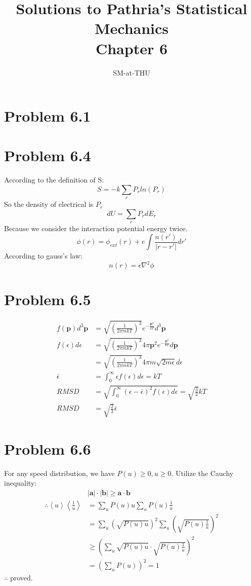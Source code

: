\documentclass{article}
\author{SM-at-THU}
\title{\bf{Solutions to Pathria's Statistical Mechanics}\\Chapter 6}
\begin{document}
\maketitle
\section*{Problem 6.1}


\section*{Problem 6.4}
According to the definition of S:
$$S=-k\sum_{r}P_{r}ln(P_{r})$$
So the density of electrical is $P_{r}$
$$dU=\sum_{r}P_rdE_r$$
Because we consider the interaction potential energy twice.
$$\phi(r)=\phi_{ext}(r)+e\int\frac{n(r')}{|r-r'|}dr'$$
According to gauss's law:
$$n(r)=\epsilon\nabla^2{\phi}$$

\section*{Problem 6.5}
	\begin{align}
		f(\bm{p})d^3\bm{p}&=\sqrt{(\frac{1}{2\pi mkT})^3} e^{-\frac{\bm{p}^2}{kT}}d^3\bm{p}\\
		f(\epsilon)d\epsilon&=\sqrt{(\frac{1}{2\pi mkT})^3} 4\pi \bm{p}^2 e^{-\frac{\bm{p}^2}{kT}}d\bm{p} \nonumber\\
		&=\sqrt{(\frac{1}{2\pi mkT})^3} 4\pi m\sqrt{2m\epsilon} d\epsilon\\
		\bar{\epsilon}&=\int_0^\infty{\epsilon f(\epsilon)}d\epsilon=kT\\
		RMSD&=\sqrt{\int_0^\infty{(\epsilon-\bar{\epsilon})^2f(\epsilon)}d\epsilon}=\sqrt{\frac{3}{2}}kT\\
		RMSD&=\sqrt{\frac{2}{3}}\bar{\epsilon}
	\end{align}

\section*{Problem 6.6} %
\label{sec:problem_6_6}
	For any speed distribution, we have $ P(u)\ge0,u\ge 0 $. Utilize the Cauchy inequality:
	\begin{align*}
		&|\bm a|\cdot|\bm b|\ge \bm a \cdot \bm b\\
		\therefore \left< u\right> \left< \frac{1}{u} \right>&=\sum_u P(u)u \sum_u P(u)\frac{1}{u}\\
		&=\sum_u \left(\sqrt{P(u)u}\right)^2 \sum_u \left(\sqrt{P(u)  \frac{1}{u} }\right)^2\\
		&\ge \left( \sum_u \sqrt{P(u)u} \cdot \sqrt{P(u)  \frac{1}{u}} \right)^2\\
		&=\left( \sum_u P(u) \right)^2=1
	\end{align*}
	$ \therefore $ proved.
\end{document}
